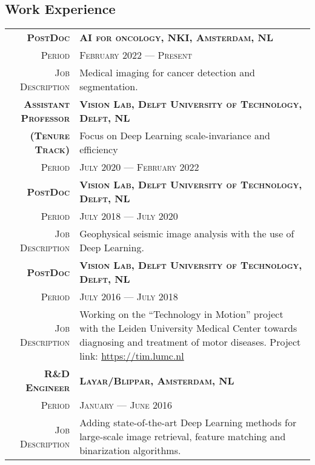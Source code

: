 \documentclass[a4paper, oneside, final]{scrartcl}
\newcommand{\gray}{\rowcolor[gray]{.90}}
\begin{document}
\begin{center}
		\section{Work Experience}
		\begin{tabular}{r@{\hskip 0.3in}p{13.3cm}}
			\gray \textsc{\textbf{PostDoc}} & \textsc{\textbf{AI for oncology, NKI, Amsterdam, NL}}\\
			\textsc{Period}                     & \textsc{February 2022 --- Present} \\
			\textsc{Job Description}            & Medical imaging for cancer detection and segmentation. 
            \vspace{5px}\\
			\gray \textsc{\textbf{Assistant Professor}} & \textsc{\textbf{Vision Lab, Delft University of Technology, Delft, NL}}\\
			\gray \textsc{\textbf{(Tenure Track)}} & Focus on Deep Learning scale-invariance and efficiency\\
			\textsc{Period}                     & \textsc{July 2020 --- February 2022} 
            \vspace{5px}\\
			\gray \textsc{\textbf{PostDoc}}     & \textsc{\textbf{Vision Lab, Delft University of Technology, Delft, NL}}\\
			\textsc{Period}                     & \textsc{July 2018 --- July 2020} \\
			\textsc{Job Description}            & Geophysical seismic image analysis with the use of Deep Learning. 
            \vspace{5px}\\
			\gray \textsc{\textbf{PostDoc}}     & \textsc{\textbf{Vision Lab, Delft University of Technology, Delft, NL}}\\
			\textsc{Period}                     & \textsc{July 2016 --- July 2018} \\
			\textsc{Job Description}            & Working on the ``Technology in Motion'' project with the Leiden University Medical Center 
				towards diagnosing and treatment of motor diseases.
				Project link: \href{https://tim.lumc.nl}{https://tim.lumc.nl}
            \vspace{5px}\\
			\gray \textsc{\textbf{R\&D Engineer}}   & \textsc{\textbf{Layar\slash Blippar, Amsterdam, NL}}\\
			\textsc{Period}                         & \textsc{January --- June 2016} \\
			\textsc{Job Description}                &  Adding state-of-the-art Deep Learning methods for large-scale image retrieval, 
				feature matching and binarization algorithms.\\
		\end{tabular}


\end{center}
\end{document}
